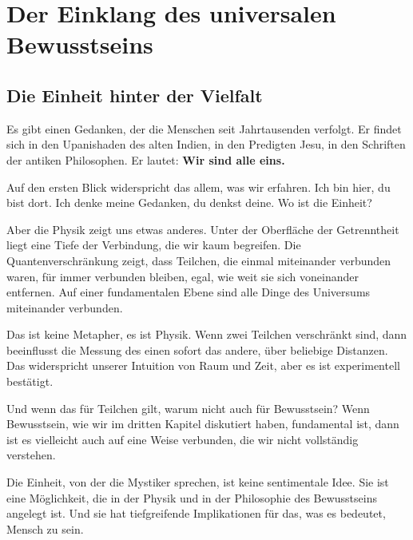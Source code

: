 
\chapter{Der Einklang des universalen Bewusstseins}

\section{Die Einheit hinter der Vielfalt}

Es gibt einen Gedanken, der die Menschen seit Jahrtausenden verfolgt. Er findet sich in den Upanishaden des alten Indien, in den Predigten Jesu, in den Schriften der antiken Philosophen. Er lautet: \textbf{Wir sind alle eins.}

Auf den ersten Blick widerspricht das allem, was wir erfahren. Ich bin hier, du bist dort. Ich denke meine Gedanken, du denkst deine. Wo ist die Einheit?

Aber die Physik zeigt uns etwas anderes. Unter der Oberfläche der Getrenntheit liegt eine Tiefe der Verbindung, die wir kaum begreifen. Die Quantenverschränkung zeigt, dass Teilchen, die einmal miteinander verbunden waren, für immer verbunden bleiben, egal, wie weit sie sich voneinander entfernen. Auf einer fundamentalen Ebene sind alle Dinge des Universums miteinander verbunden.

Das ist keine Metapher, es ist Physik. Wenn zwei Teilchen verschränkt sind, dann beeinflusst die Messung des einen sofort das andere, über beliebige Distanzen. Das widerspricht unserer Intuition von Raum und Zeit, aber es ist experimentell bestätigt.

Und wenn das für Teilchen gilt, warum nicht auch für Bewusstsein? Wenn Bewusstsein, wie wir im dritten Kapitel diskutiert haben, fundamental ist, dann ist es vielleicht auch auf eine Weise verbunden, die wir nicht vollständig verstehen.

Die Einheit, von der die Mystiker sprechen, ist keine sentimentale Idee. Sie ist eine Möglichkeit, die in der Physik und in der Philosophie des Bewusstseins angelegt ist. Und sie hat tiefgreifende Implikationen für das, was es bedeutet, Mensch zu sein.

